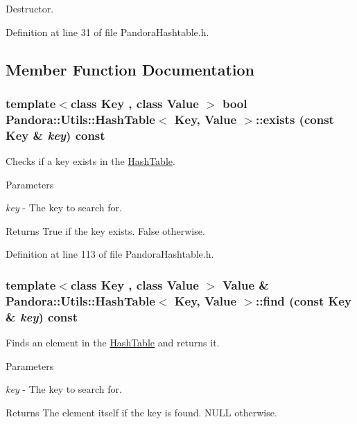 Destructor. 

Definition at line 31 of file PandoraHashtable.h.

\subsection{Member Function Documentation}
\hypertarget{classPandora_1_1Utils_1_1HashTable_a61bb5ce54f3380c10edebb59cac114cd}{
\subsubsection[{exists}]{\setlength{\rightskip}{0pt plus 5cm}template$<$class Key , class Value $>$ bool {\bf Pandora::Utils::HashTable}$<$ Key, Value $>$::exists (const Key \& {\em key}) const}}
\label{classPandora_1_1Utils_1_1HashTable_a61bb5ce54f3380c10edebb59cac114cd}


Checks if a key exists in the \hyperlink{classPandora_1_1Utils_1_1HashTable}{HashTable}. 
\begin{DoxyParams}{Parameters}
\item[{\em key}]-\/ The key to search for. \end{DoxyParams}
\begin{DoxyReturn}{Returns}
True if the key exists. False otherwise. 
\end{DoxyReturn}


Definition at line 113 of file PandoraHashtable.h.\hypertarget{classPandora_1_1Utils_1_1HashTable_ab1aae3564898a1de7870930f7e678de0}{
\subsubsection[{find}]{\setlength{\rightskip}{0pt plus 5cm}template$<$class Key , class Value $>$ Value \& {\bf Pandora::Utils::HashTable}$<$ Key, Value $>$::find (const Key \& {\em key}) const}}
\label{classPandora_1_1Utils_1_1HashTable_ab1aae3564898a1de7870930f7e678de0}


Finds an element in the \hyperlink{classPandora_1_1Utils_1_1HashTable}{HashTable} and returns it. 
\begin{DoxyParams}{Parameters}
\item[{\em key}]-\/ The key to search for. \end{DoxyParams}
\begin{DoxyReturn}{Returns}
The element itself if the key is found. NULL otherwise. 
\end{DoxyReturn}


